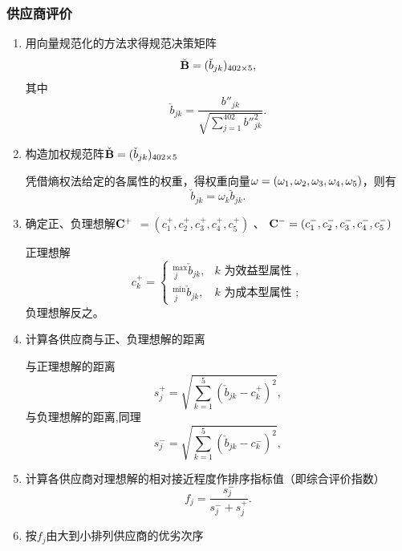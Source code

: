 \subsubsection{供应商评价}

\begin{enumerate}

\item 用向量规范化的方法求得规范决策矩阵
\begin{equation}
 \breve{\bf{B}} =(\breve{b}_{jk})_{402 \times 5},
\end{equation}
其中
\begin{equation}
    \breve{b}_{jk}=\frac{{b''}_{jk}}{\sqrt{\sum_{j=1}^{402}{b''}_{jk}^2}}.
\end{equation}

\item 构造加权规范阵$ \check{\bf{B}}  =(\check{b}_{jk})_{402 \times 5}$

凭借熵权法给定的各属性的权重，得权重向量${\bf{\omega}} =(\omega_1,\omega_2,\omega_3,\omega_4,\omega_5)$，则有
\begin{equation}
    \check{b}_{jk}=\omega_k\breve{b}_{jk}.
\end{equation}
\item 确定正、负理想解$ \bf C^+$ $=(c_1^+,c_2^+,c_3^+,c_4^+,c_5^+)$
、
${\bf C^{-}}=(c_1^-,c_2^-,c_3^-,c_4^-,c_5^-)$

正理想解
\begin{equation}
c_{k}^{+}=\left\{\begin{array}{ll}
{ }_{\ j}^{\max } \check{b}_{jk}, & k \text { 为效益型属性 }, \\
{ }_{\ j}^{\min } \check{b}_{jk}, & k \text { 为成本型属性 };
\end{array}\right.
\end{equation}
负理想解反之。

\item 计算各供应商与正、负理想解的距离

与正理想解的距离
\begin{equation}
    s_j^+=\sqrt{\sum_{k=1}^5(\check{b}_{jk}-c_k^+)^2} ,
\end{equation}
与负理想解的距离,同理
\begin{equation}
    s_j^-=\sqrt{\sum_{k=1}^5(\check{b}_{jk}-c_k^-)^2} ,
\end{equation}
\item 计算各供应商对理想解的相对接近程度作排序指标值（即综合评价指数）
\begin{equation}
    f_j=\frac{s_j^-}{s_j^-+s_j^+}.
\end{equation}
\item 按$f_j$由大到小排列供应商的优劣次序

\newpage

\end{enumerate}

